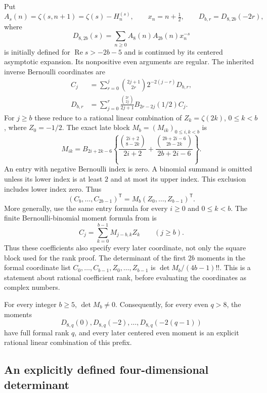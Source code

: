 Put
\[
 A_s(n)=\zeta(s,n+1)=\zeta(s)-H_n^{(s)},\qquad x_n=n+\tfrac12,
 \qquad D_{b,r}=D_{8,2b}(-2r),
\]
where
\[
 D_{8,2b}(s)=\sum_{n\ge0}A_8(n)A_{2b}(n)x_n^{-s}
\]
is initially defined for $\operatorname{Re}s>-2b-5$ and is continued
by its centered asymptotic expansion. Its nonpositive even arguments
are regular. The inherited inverse Bernoulli coordinates are
\begin{align}
 C_j&=\sum_{r=0}^j\binom{2j+1}{2r}2^{-2(j-r)}D_{b,r},
 \label{r8c:C}\\
 D_{b,r}&=\sum_{j=0}^r\frac{\binom{2r}{2j}}{2j+1}
 B_{2r-2j}(1/2)C_j.
 \label{r8c:D}
\end{align}
For $j\ge b$ these reduce to a rational linear combination of
$Z_k=\zeta(2k)$, $0\le k<b$, where $Z_0=-1/2$.
The exact late block $M_b=(M_{ik})_{0\le i,k<b}$ is
\begin{equation}\label{r8c:M}
 M_{ik}=B_{2i+2k-6}
 \left\{\frac{\binom{2i+2}{8-2k}}{2i+2}
 +\frac{\binom{2b+2i-6}{2b-2k}}{2b+2i-6}\right\}.
\end{equation}
An entry with negative Bernoulli index is zero. A binomial summand is
omitted unless its lower index is at least $2$ and at most its upper
index. This exclusion includes lower index zero. Thus
\[
 (C_b,\ldots,C_{2b-1})^{\mathsf T}
       =M_b(Z_0,\ldots,Z_{b-1})^{\mathsf T}.
\]
More generally, use the same entry formula for every $i\ge0$ and
$0\le k<b$.  The finite Bernoulli-binomial moment formula from
\cite{GeneralHankel} is
\[
 C_j=\sum_{k=0}^{b-1}M_{j-b,k}Z_k\qquad(j\ge b).
\]
Thus these coefficients also specify every later coordinate,
not only the square block used for the rank proof.
The determinant of the first $2b$ moments in the formal coordinate
list $C_0,\ldots,C_{b-1},Z_0,\ldots,Z_{b-1}$ is
$\det M_b/(4b-1)!!$. This is a statement about rational coefficient
rank, before evaluating the coordinates as complex numbers.

\begin{theorem}
\label{r8c:main}
For every integer $b\ge5$, $\det M_b\ne0$. Consequently, for every
even $q>8$, the moments
\[
 D_{8,q}(0),D_{8,q}(-2),\ldots,D_{8,q}(-2(q-1))
\]
have full formal rank $q$, and every later centered even moment is
an explicit rational linear combination of this prefix.
\end{theorem}

\subsection{An explicitly defined four-dimensional determinant}

